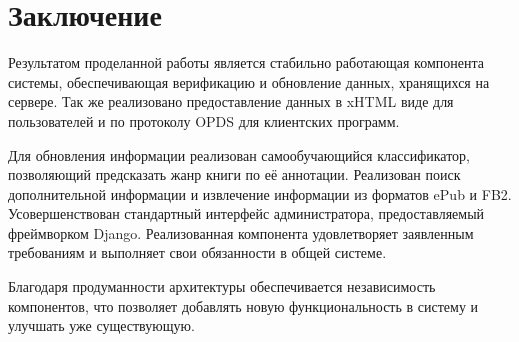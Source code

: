 \section{Заключение}

Результатом проделанной работы является стабильно работающая компонента системы, обеспечивающая верификацию и обновление данных, хранящихся на сервере. Так же реализовано предоставление данных в xHTML виде для пользователей и по протоколу OPDS для клиентских программ. 

Для обновления информации реализован самообучающийся классификатор, позволяющий предсказать жанр книги по её аннотации. Реализован поиск дополнительной информации и извлечение информации из форматов ePub и FB2. Усовершенствован стандартный интерфейс администратора, пре\-доставляемый фреймворком Django. Реализованная компонента удовлетворяет заявленным требованиям и выполняет свои обязанности в общей системе. 

Благодаря продуманности архитектуры обеспечивается независимость \\компонентов, что позволяет добавлять новую функциональность в систему и улучшать уже существующую.

\newpage